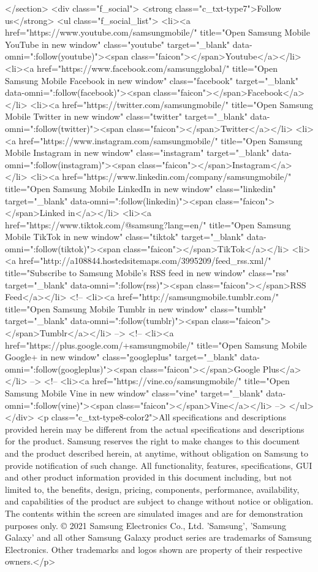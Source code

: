 {{{{{{{{{{{{{{{{{{{{{{{{{{{{{{{{{{{{{{{{{{{{{{{{{{{{{			</section>
			<div class="f_social">
				<strong class="c_txt-type7">Follow us</strong>
				<ul class="f_social_list">
					<li><a href="https://www.youtube.com/samsungmobile/" title="Open Samsung Mobile YouTube in new window" class="youtube" target="_blank" data-omni=":follow(youtube)"><span class="faicon"></span>Youtube</a></li>
					<li><a href="https://www.facebook.com/samsungglobal/" title="Open Samsung Mobile Facebook in new window" class="facebook" target="_blank" data-omni=":follow(facebook)"><span class="faicon"></span>Facebook</a></li>
					<li><a href="https://twitter.com/samsungmobile/" title="Open Samsung Mobile Twitter in new window" class="twitter" target="_blank" data-omni=":follow(twitter)"><span class="faicon"></span>Twitter</a></li>
					<li><a href="https://www.instagram.com/samsungmobile/" title="Open Samsung Mobile Instagram in new window" class="instagram" target="_blank" data-omni=":follow(instagram)"><span class="faicon"></span>Instagram</a></li>
					<li><a href="https://www.linkedin.com/company/samsungmobile/" title="Open Samsung Mobile LinkedIn in new window" class="linkedin" target="_blank" data-omni=":follow(linkedin)"><span class="faicon"></span>Linked in</a></li>
					<li><a href="https://www.tiktok.com/@samsung?lang=en/" title="Open Samsung Mobile TikTok in new window" class="tiktok" target="_blank" data-omni=":follow(tiktok)"><span class="faicon"></span>TikTok</a></li>
					<li><a href="http://a108844.hostedsitemaps.com/3995209/feed_rss.xml/" title="Subscribe to Samsung Mobile's RSS feed in new window" class="rss" target="_blank" data-omni=":follow(rss)"><span class="faicon"></span>RSS Feed</a></li>
					<!-- <li><a href="http://samsungmobile.tumblr.com/" title="Open Samsung Mobile Tumblr in new window" class="tumblr" target="_blank" data-omni=":follow(tumblr)"><span class="faicon"></span>Tumblr</a></li> -->
					<!-- <li><a href="https://plus.google.com/+samsungmobile/" title="Open Samsung Mobile Google+ in new window" class="googleplus" target="_blank" data-omni=":follow(googleplus)"><span class="faicon"></span>Google Plus</a></li> -->
					<!-- <li><a href="https://vine.co/samsungmobile/" title="Open Samsung Mobile Vine in new window" class="vine" target="_blank" data-omni=":follow(vine)"><span class="faicon"></span>Vine</a></li> -->
				</ul>
			</div>
			<p class="c_txt-type8-color2">All specifications and descriptions provided herein may be different from the actual specifications and descriptions for the product. Samsung reserves the right to make changes to this document and the product described herein, at anytime, without obligation on Samsung to provide notification of such change. All functionality, features, specifications, GUI and other product information provided in this document including, but not limited to, the benefits, design, pricing, components, performance, availability, and capabilities of the product are subject to change without notice or obligation. The contents within the screen are simulated images and are for demonstration purposes only. © 2021 Samsung Electronics Co., Ltd.  'Samsung', 'Samsung Galaxy' and all other Samsung Galaxy product series are trademarks of Samsung Electronics. Other trademarks and logos shown are property of their respective owners.</p>
}}}}}}}}}}}}}}}}}}}}}}}}}}}}}}}}}}}}}}}}}}}}}}}}}}}}}
